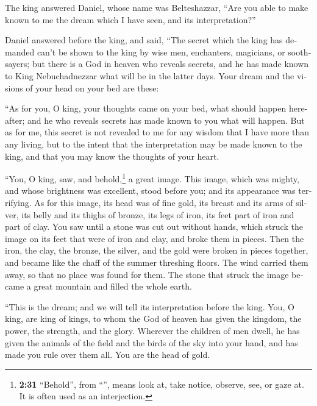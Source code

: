 \begin{paracol}{2}
\begin{otherlanguage}{english}
 The king answered Daniel, whose name was Belteshazzar,
``Are you able to make known to me the dream which I have seen, and its
interpretation?''

 Daniel answered before the king, and said, ``The secret
which the king has demanded can't be shown to the king by wise men,
enchanters, magicians, or soothsayers;  but there is a
God in heaven who reveals secrets, and he has made known to King
Nebuchadnezzar what will be in the latter days. Your dream and the
visions of your head on your bed are these:

 ``As for you, O king, your thoughts came on your bed,
what should happen hereafter; and he who reveals secrets has made known
to you what will happen.  But as for me, this secret is
not revealed to me for any wisdom that I have more than any living, but
to the intent that the interpretation may be made known to the king, and
that you may know the thoughts of your heart.

 ``You, O king, saw, and behold,\footnote{\textbf{2:31}
  ``Behold'', from ``'', means look at, take notice,
  observe, see, or gaze at. It is often used as an interjection.} a
great image. This image, which was mighty, and whose brightness was
excellent, stood before you; and its appearance was terrifying.
 As for this image, its head was of fine gold, its breast
and its arms of silver, its belly and its thighs of bronze,
 its legs of iron, its feet part of iron and part of
clay.  You saw until a stone was cut out without hands,
which struck the image on its feet that were of iron and clay, and broke
them in pieces.  Then the iron, the clay, the bronze, the
silver, and the gold were broken in pieces together, and became like the
chaff of the summer threshing floors. The wind carried them away, so
that no place was found for them. The stone that struck the image became
a great mountain and filled the whole earth.

 ``This is the dream; and we will tell its interpretation
before the king.  You, O king, are king of kings, to whom
the God of heaven has given the kingdom, the power, the strength, and
the glory.  Wherever the children of men dwell, he has
given the animals of the field and the birds of the sky into your hand,
and has made you rule over them all. You are the head of gold.


\end{otherlanguage}
\end{paracol}
